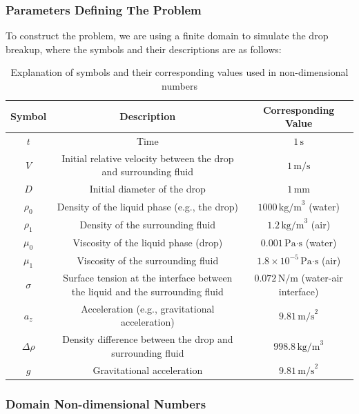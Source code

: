 \documentclass[12pt]{article}
\begin{document}
\subsubsection{Parameters Defining The Problem}
To construct the problem, we are using a finite domain to simulate the drop breakup, where the symbols and their descriptions are as follows:
\begin{table}[H]
\scriptsize
\centering
\caption{Explanation of symbols and their corresponding values used in non-dimensional numbers}
\renewcommand{\arraystretch}{1.5} %
\begin{tabular}{|c|c|c|}
\hline
\textbf{Symbol} & \textbf{Description} & \textbf{Corresponding Value} \\ \hline
$t$     & Time & $1 \, \text{s}$ \\ \hline
$V$     & Initial relative velocity between the drop and surrounding fluid & $1 \, \text{m/s}$ \\ \hline
$D$     & Initial diameter of the drop & $1 \, \text{mm}$ \\ \hline
$\rho_0$ & Density of the liquid phase (e.g., the drop) & $1000 \, \text{kg/m}^3$ (water) \\ \hline
$\rho_1$ & Density of the surrounding fluid & $1.2 \, \text{kg/m}^3$ (air) \\ \hline
$\mu_0$  & Viscosity of the liquid phase (drop) & $0.001 \, \text{Pa·s}$ (water) \\ \hline
$\mu_1$  & Viscosity of the surrounding fluid & $1.8 \times 10^{-5} \, \text{Pa·s}$ (air) \\ \hline
$\sigma$ & Surface tension at the interface between the liquid and the surrounding fluid & $0.072 \, \text{N/m}$ (water-air interface) \\ \hline
$a_z$ & Acceleration (e.g., gravitational acceleration) & $9.81 \, \text{m/s}^2$ \\ \hline
$\Delta \rho$ & Density difference between the drop and surrounding fluid & $998.8 \, \text{kg/m}^3$ \\ \hline
$g$ & Gravitational acceleration & $9.81 \, \text{m/s}^2$ \\ \hline
\end{tabular}
\label{tab:SymbolExplanations}
\end{table}

\subsubsection{Domain Non-dimensional Numbers}
\end{document}
